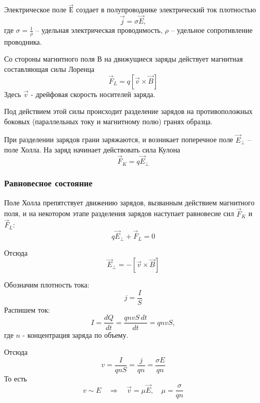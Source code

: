 Электрическое поле $\vec{Е}$ создает в полупроводнике электрический ток плотностью 
\begin{equation}
	\vec{j}=\sigma\vec{E},
\end{equation}
где $\sigma=\frac{1}{\rho}$ -- удельная электрическая проводимость, $\rho$ -- удельное сопротивление проводника. 

Со стороны магнитного поля В на движущиеся заряды действует магнитная составляющая силы Лоренца 
\begin{equation}
	\label{eq:fl}
	\vec{F}_L=q[\vec{v}\times\vec{B}]
\end{equation}
Здесь $\vec{v}$ - дрейфовая скорость носителей заряда.

Под действием этой силы происходит разделение зарядов на противоположных боковых (параллельных току и магнитному полю) гранях образца.

При разделении зарядов грани заряжаются, и возникает поперечное поле $\vec{E}_\perp$ -- поле Холла. На заряд начинает действовать сила Кулона
\begin{equation}
	\vec{F}_K=q\vec{E}_\perp
\end{equation}

\subsubsection{Равновесное состояние}

Поле Холла препятствует движению зарядов, вызванным действием магнитного поля, и на некотором этапе разделения зарядов наступает равновесие сил $\vec{F}_K$ и $\vec{F}_L$:
\begin{equation}
	\label{eq:eq}
	q\vec{E}_\perp+\vec{F}_L=0
\end{equation}

Отсюда
\begin{equation}
	\label{eq:ep}
	\vec{E}_\perp=-[\vec{v}\times\vec{B}]
\end{equation}

Обозначим плотность тока:
\begin{equation}
j=\frac{I}{S}
\end{equation}
Распишем ток:
\begin{equation}
I=\frac{dQ}{dt}=\frac{qnvS\,dt}{dt}=qnvS,
\end{equation}
где $n$ - концентрация заряда по объему.

Отсюда
\begin{equation}
v=\frac{I}{qnS}=\frac{j}{qn}=\frac{\sigma E}{qn}
\end{equation}
То есть
\begin{equation}
	\label{eq:mue}
	v\sim E
	\quad\Rightarrow\quad
	\vec{v}=\mu \vec E, \quad \mu=\frac{\sigma}{qn}
\end{equation}

